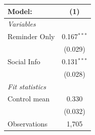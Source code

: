 
\begingroup
\centering
\begin{tabular}{lc}
   \tabularnewline \midrule \midrule
   Model:        & (1)\\  
   \midrule
   \emph{Variables}\\
   Reminder Only & 0.167$^{***}$\\   
                 & (0.029)\\   
   Social Info   & 0.131$^{***}$\\   
                 & (0.028)\\   
   \midrule
   \emph{Fit statistics}\\
   Control mean  & 0.330\\  
                 & (0.032)\\  
   Observations  & 1,705\\  
   \midrule \midrule
\end{tabular}
\par\endgroup


